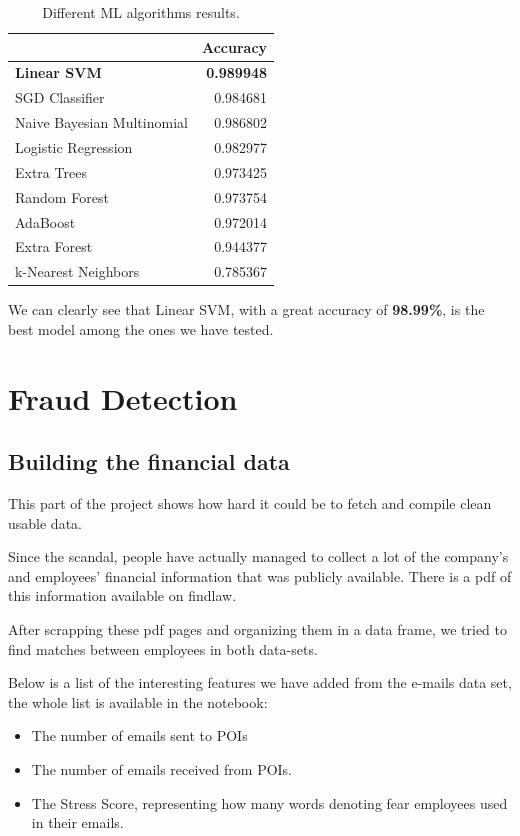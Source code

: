 \documentclass[11pt]{article}
\begin{document}
\begin{table}[htb]
\centering
\begin{tabular}{|l|r|} 
\cline{2-2}
\multicolumn{1}{l|}{}      & Accuracy  \\ 
\hline
\textbf{Linear SVM}  & \textbf{0.989948	}  \\ 
\hline
SGD Classifier &	0.984681\\ 
\hline
Naive Bayesian Multinomial &	0.986802\\ 
\hline
Logistic Regression	 & 0.982977\\ 
\hline
Extra Trees	& 0.973425\\ 
\hline
Random Forest	& 0.973754\\ 
\hline
AdaBoost	& 0.972014\\ 
\hline
Extra Forest & 	0.944377\\ 
\hline
k-Nearest Neighbors & 	0.785367\\ 
\hline

\end{tabular}
 \caption{Different ML algorithms results.}
    \label{tab:results_spam}
\end{table}

We can clearly see that Linear SVM, with a great accuracy of \textbf{98.99\%}, is the best model among the ones we have tested.




\section{Fraud Detection}\label{Fraud Detection}
\subsection{Building the financial data}
This part of the project shows how hard it could be to fetch and compile clean usable data.

Since the scandal, people have actually managed to collect a lot of the company's and employees' financial information that was publicly available. There is a pdf of this information available on findlaw\cite{findlaw}.

After scrapping these pdf pages and organizing them in a data frame, we tried to find matches between employees in both data-sets.

Below is a list of the interesting features we have added from the e-mails data set, the whole list is available in the notebook: 
\vspace{-3mm}
\begin{itemize}
\item The number of emails sent to POIs
\vspace{-3mm}
\item The number of emails received from POIs.
\vspace{-3mm}
\item The Stress Score, representing how many words denoting fear employees used in their emails.
\end{itemize}
\end{document}
